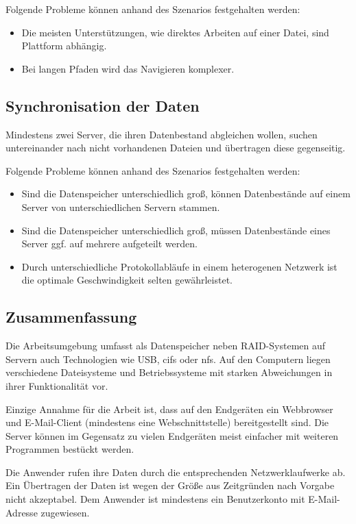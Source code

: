 \documentclass[oneside, ngerman, toc=bibliography,bibliography=totoc,listof=entryprefix, open=right,numbers=noenddot,fontsize=12pt]{scrbook}
\begin{document}
\bigskip
Folgende Probleme können anhand des Szenarios festgehalten werden:
\begin{itemize}
	\item Die meisten Unterstützungen, wie direktes Arbeiten auf einer Datei, sind Plattform abhängig.
	\item Bei langen Pfaden wird das Navigieren komplexer.
\end{itemize}


\subsection*{Synchronisation der Daten}
Mindestens zwei Server, die ihren Datenbestand abgleichen wollen, suchen untereinander nach nicht vorhandenen Dateien und übertragen diese gegenseitig.

\bigskip
Folgende Probleme können anhand des Szenarios festgehalten werden:
\begin{itemize}
	\item Sind die Datenspeicher unterschiedlich groß, können Datenbestände auf einem Server von unterschiedlichen Servern stammen.
	\item Sind die Datenspeicher unterschiedlich groß, müssen Datenbestände eines Server ggf. auf mehrere aufgeteilt werden.
	\item Durch unterschiedliche Protokollabläufe in einem heterogenen Netzwerk ist die optimale Geschwindigkeit selten gewährleistet.
\end{itemize}
 
\subsection*{Zusammenfassung}
Die Arbeitsumgebung umfasst als Datenspeicher neben RAID-Systemen auf Servern auch Technologien  wie USB,  \acrshort{cifs} oder \acrshort{nfs}.
Auf den Computern liegen verschiedene Dateisysteme und Betriebssysteme mit starken Abweichungen in ihrer Funktionalität vor.

Einzige Annahme für die Arbeit ist, dass auf den Endgeräten ein Webbrowser und  E-Mail-Client (mindestens eine Webschnittstelle) bereitgestellt sind.
Die Server können im Gegensatz zu vielen Endgeräten meist einfacher mit weiteren Programmen bestückt werden.

Die Anwender rufen ihre Daten durch die entsprechenden Netzwerklaufwerke ab.
Ein Übertragen der Daten ist wegen der Größe aus Zeitgründen nach Vorgabe nicht akzeptabel. Dem Anwender ist mindestens ein Benutzerkonto mit E-Mail-Adresse zugewiesen.
\end{document}
